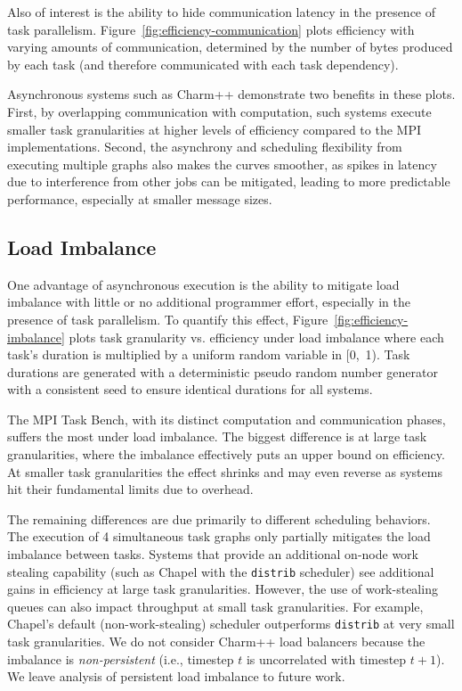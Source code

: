 Also of interest is the ability to
hide communication latency in the presence of task
parallelism. Figure~\ref{fig:efficiency-communication} plots efficiency with varying amounts of
communication, determined by the number
of bytes produced by each task (and therefore communicated with each
task dependency).

Asynchronous systems such as Charm++ demonstrate two benefits in
these plots. First, by overlapping communication with computation,
such systems execute smaller task granularities at higher
levels of efficiency compared to the MPI
implementations. Second, the asynchrony and scheduling flexibility from
executing multiple graphs also makes the curves smoother,
as spikes in latency due to interference from other jobs can be
mitigated, leading to more predictable performance, especially at
smaller message sizes.

\subsection{Load Imbalance}



One advantage of asynchronous execution is
the ability to mitigate load imbalance with little or no additional programmer effort, especially in the presence of
task parallelism. To quantify this effect,
Figure~\ref{fig:efficiency-imbalance} plots task granularity vs.
efficiency under load imbalance where each task's duration is multiplied by a uniform random variable in [0,~1). Task durations are generated with a deterministic
pseudo random number generator with a consistent seed to ensure
identical durations for all systems.

The MPI Task Bench, with its distinct computation and communication phases,
suffers the most under load imbalance. The biggest
difference is at large task granularities, where the imbalance
effectively puts an upper bound on efficiency. At smaller task
granularities the effect shrinks and may even reverse as systems hit
their fundamental limits due to overhead.

The remaining differences are due primarily to
different scheduling behaviors. The execution of 4
simultaneous task graphs only partially mitigates the
load imbalance between tasks. Systems that provide an
additional on-node work stealing capability (such as Chapel with the \texttt{distrib} scheduler) see additional gains in
efficiency at large task granularities. However, the use of
work-stealing queues can also impact throughput at small task
granularities. For example, Chapel's default (non-work-stealing) scheduler outperforms \texttt{distrib} at very small task granularities. We do not consider Charm++ load balancers because the imbalance is \emph{non-persistent} (i.e., timestep $t$ is uncorrelated with timestep $t+1$). We leave analysis of persistent load imbalance to future work.

